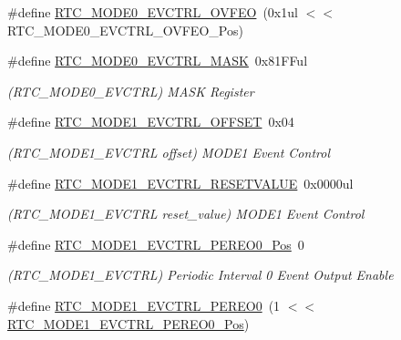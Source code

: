 \begin{DoxyCompactItemize}
\#define \mbox{\hyperlink{group___s_a_m_d21___r_t_c_gaa564a9f73ee6f1f9a790edc3dbf74a3a}{R\+T\+C\+\_\+\+M\+O\+D\+E0\+\_\+\+E\+V\+C\+T\+R\+L\+\_\+\+O\+V\+F\+EO}}~(0x1ul $<$$<$ R\+T\+C\+\_\+\+M\+O\+D\+E0\+\_\+\+E\+V\+C\+T\+R\+L\+\_\+\+O\+V\+F\+E\+O\+\_\+\+Pos)
\item 
\#define \mbox{\hyperlink{group___s_a_m_d21___r_t_c_ga55b837245e3d0c897bb9d42b0d1b04e0}{R\+T\+C\+\_\+\+M\+O\+D\+E0\+\_\+\+E\+V\+C\+T\+R\+L\+\_\+\+M\+A\+SK}}~0x81\+F\+Ful
\begin{DoxyCompactList}\small\item\em (R\+T\+C\+\_\+\+M\+O\+D\+E0\+\_\+\+E\+V\+C\+T\+RL) M\+A\+SK Register \end{DoxyCompactList}\item 
\#define \mbox{\hyperlink{group___s_a_m_d21___r_t_c_ga9c81fb51d590fbcc34e476ba2458c4a6}{R\+T\+C\+\_\+\+M\+O\+D\+E1\+\_\+\+E\+V\+C\+T\+R\+L\+\_\+\+O\+F\+F\+S\+ET}}~0x04
\begin{DoxyCompactList}\small\item\em (R\+T\+C\+\_\+\+M\+O\+D\+E1\+\_\+\+E\+V\+C\+T\+RL offset) M\+O\+D\+E1 Event Control \end{DoxyCompactList}\item 
\#define \mbox{\hyperlink{group___s_a_m_d21___r_t_c_ga2a8ab3bc81a30c0e7e2cc4d8d2d371c3}{R\+T\+C\+\_\+\+M\+O\+D\+E1\+\_\+\+E\+V\+C\+T\+R\+L\+\_\+\+R\+E\+S\+E\+T\+V\+A\+L\+UE}}~0x0000ul
\begin{DoxyCompactList}\small\item\em (R\+T\+C\+\_\+\+M\+O\+D\+E1\+\_\+\+E\+V\+C\+T\+RL reset\+\_\+value) M\+O\+D\+E1 Event Control \end{DoxyCompactList}\item 
\#define \mbox{\hyperlink{group___s_a_m_d21___r_t_c_gac51c19f1185092eaa8313ad4fcb4a1b5}{R\+T\+C\+\_\+\+M\+O\+D\+E1\+\_\+\+E\+V\+C\+T\+R\+L\+\_\+\+P\+E\+R\+E\+O0\+\_\+\+Pos}}~0
\begin{DoxyCompactList}\small\item\em (R\+T\+C\+\_\+\+M\+O\+D\+E1\+\_\+\+E\+V\+C\+T\+RL) Periodic Interval 0 Event Output Enable \end{DoxyCompactList}\item 
\#define \mbox{\hyperlink{group___s_a_m_d21___r_t_c_ga42fd2e55d59c4808c0738a590e8d804d}{R\+T\+C\+\_\+\+M\+O\+D\+E1\+\_\+\+E\+V\+C\+T\+R\+L\+\_\+\+P\+E\+R\+E\+O0}}~(1 $<$$<$ \mbox{\hyperlink{group___s_a_m_d21___r_t_c_gac51c19f1185092eaa8313ad4fcb4a1b5}{R\+T\+C\+\_\+\+M\+O\+D\+E1\+\_\+\+E\+V\+C\+T\+R\+L\+\_\+\+P\+E\+R\+E\+O0\+\_\+\+Pos}})
\item 

\end{DoxyCompactItemize}
